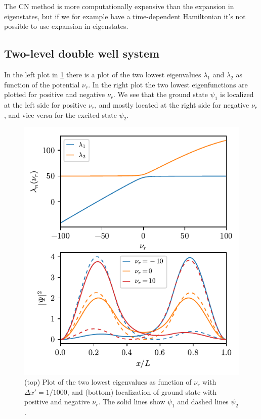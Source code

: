 The CN method is more computationally expensive than the expansion in eigenstates, but if we for example have a time-dependent Hamiltonian it's not possible to use expansion in eigenstates.

\subsection*{Two-level double well system}

In the left plot in \cref{fig:detuning1} there is a plot of the two lowest eigenvalues $\lambda_1$ and $\lambda_2$ as function of the potential $\nu_r$. In the right plot the two lowest eigenfunctions are plotted for positive and negative $\nu_r$. We see that the ground state $\psi_1$ is localized at the left side for positive $\nu_r$, and mostly located at the right side for negative $\nu_r$, and vice versa for the excited state $\psi_2$.
\begin{figure}[ht!]%
\centering%
\includegraphics{figs/task4.pdf}%
\caption{(top) Plot of the two lowest eigenvalues as function of $\nu_r$ with $\Delta x' = 1/1000$, and (bottom) localization of ground state with positive and negative $\nu_r$. The solid lines show $\psi_1$ and dashed lines $\psi_2$. \label{fig:detuning1}}%
\end{figure}